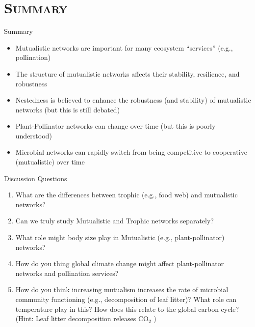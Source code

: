\section{\scshape Summary}
  \begin{frame}{Summary}
  
    \begin{itemize}[<+->] \setlength{\itemindent}{0em} \itemsep10pt
      \item Mutualistic networks are important for many ecosystem ``services'' (e.g., pollination)
      
      \item The structure of mutualistic networks affects their stability, resilience, and robustness  
        
      \item Nestedness is believed to enhance the robustness (and stability) of mutualistic networks  (but this is still debated)

      \item Plant-Pollinator networks can change over time (but this is poorly understood)
      
      \item Microbial networks can rapidly switch from being competitive to cooperative (mutualistic) over time
    \end{itemize}
  
  \end{frame}  

\begin{frame}{Discussion Questions}

  \begin{enumerate}\setlength{\itemindent}{-1em}\itemsep4pt
    
    \item What are the differences between trophic (e.g., food web) and mutualistic networks?
    
    \item Can we truly study Mutualistic and Trophic networks separately?
    
    \item What role might body size play in Mutualistic (e.g., plant-pollinator) networks? 
    
    \item How do you thing global climate change might affect plant-pollinator networks and pollination services? 
      
    \item How do you think increasing mutualism increases the rate of microbial
    community functioning (e.g., decomposition of leaf litter)? What role can
    temperature play in this? How does this relate to the global carbon cycle?
    (Hint: Leaf litter decomposition releases CO$_2$ )
  \end{enumerate}

\end{frame}

